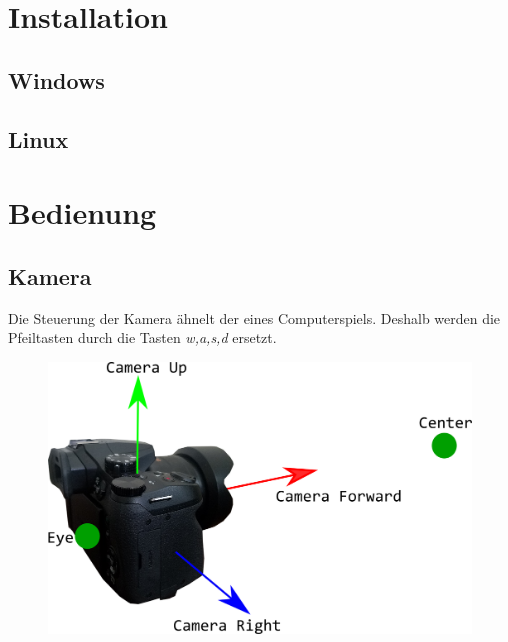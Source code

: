 \documentclass{article}
\begin{document}
\section{Installation}
\subsection{Windows}
\subsection{Linux}
\newpage
\section{Bedienung}
\subsection{Kamera}
Die Steuerung der Kamera ähnelt der eines Computerspiels. Deshalb werden die Pfeiltasten durch die Tasten \textit{w,a,s,d}
ersetzt.
\begin{figure}[H]
    \centering
    \includegraphics[scale=0.231]{camera.png}
\end{figure}
\end{document}
